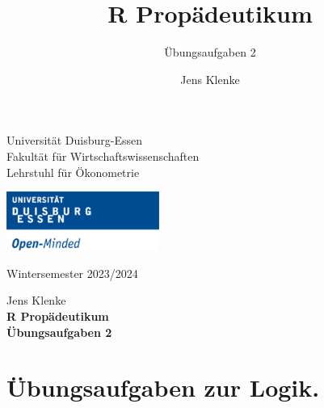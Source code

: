 \documentclass[12pt,a4paper]{article}
\title{R Propädeutikum}
\subtitle{Übungsaufgaben 2}
\author{Jens Klenke}
\date{}
\begin{document}





\restoregeometry



\begin{minipage}{0.6\textwidth}
Universität Duisburg-Essen\\
Fakultät für Wirtschaftswissenschaften\\
Lehrstuhl für Ökonometrie\\
\end{minipage}

	\begin{flushright}
	\vspace{-3cm}
	\includegraphics*[width=5cm]{includes/duelogo_en.png}\\
	\vspace{.125cm}
	\end{flushright}
\hspace{-0.005cm}Wintersemester 2023/2024

\vspace{0.05cm}

\begin{center}
	\vspace{.25cm}
	Jens Klenke \hspace{.5cm}  \\
	\vspace{.25cm}
	\textbf{\Large{R Propädeutikum}}\\
	\vspace{.25cm}
	\textbf{\large{Übungsaufgaben 2}}\\
	\vspace{.125cm}
\end{center}





\hypertarget{uxfcbungsaufgaben-zur-logik.}{%
\section{Übungsaufgaben zur Logik.}\label{uxfcbungsaufgaben-zur-logik.}}
\end{document}
